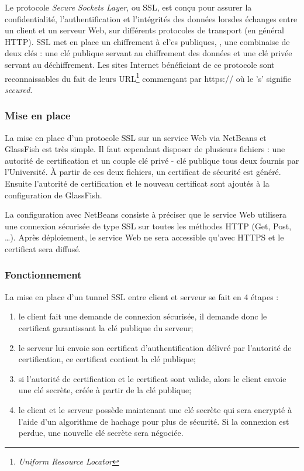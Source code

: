 Le protocole \textit{Secure Sockets Layer}, ou SSL, est con\c{c}u pour assurer la confidentialit\'e, l'authentification et l'int\'egrit\'es des donn\'ees lorsdes \'echanges entre un client et un serveur Web, sur diff\'erents protocoles de transport (en g\'en\'eral HTTP).
SSL met en place un chiffrement \`a cl'es publiques, \cad, une combinaise de deux cl\'es : une cl\'e publique servant au chiffrement des donn\'ees et une cl\'e priv\'ee servant au d\'echiffrement.
Les sites Internet b\'en\'eficiant de ce protocole sont reconnaissables du fait de leurs URL\protect\footnote{\textit{Uniform Resource Locator}} commen\c{c}ant par \textsf{https://} o\`u le 's' signifie \textit{secured}.

\subsubsection{Mise en place}

La mise en place d'un protocole SSL sur un service Web via NetBeans et GlassFish est tr\`es simple.
Il faut cependant disposer de plusieurs fichiers : une autorit\'e de certification et un couple cl\'e priv\'e - cl\'e publique tous deux fournis par l'Universit\'e.
\`A partir de ces deux fichiers, un certificat de s\'ecurit\'e est g\'en\'er\'e.
Ensuite l'autorit\'e de certification et le nouveau certificat sont ajout\'es \`a la configuration de GlassFish.

La configuration avec NetBeans consiste \`a pr\'eciser que le service Web utilisera une connexion s\'ecuris\'ee de type SSL sur toutes les m\'ethodes HTTP (Get, Post, \ldots).
Apr\`es d\'eploiement, le service Web ne sera accessible qu'avec HTTPS et le certificat sera diffus\'e.

\subsubsection{Fonctionnement}

La mise en place d'un tunnel SSL entre client et serveur se fait en 4 \'etapes :

\begin{enumerate}
	\item le client fait une demande de connexion s\'ecuris\'ee, il demande donc le certificat garantissant la cl\'e publique du serveur;
	\item le serveur lui envoie son certificat d'authentification d\'elivr\'e par l'autorit\'e de certification, ce certificat contient la cl\'e publique;
	\item si l'autorit\'e de certification et le certificat sont valide, alors le client envoie une cl\'e secr\`ete, cr\'e\'ee \`a partir de la cl\'e publique;
	\item le client et le serveur poss\`ede maintenant une cl\'e secr\`ete qui sera encrypt\'e \`a l'aide d'un algorithme de hachage pour plus de s\'ecurit\'e.
	Si la connexion est perdue, une nouvelle cl\'e secr\`ete sera n\'egoci\'ee.

\end{enumerate}

